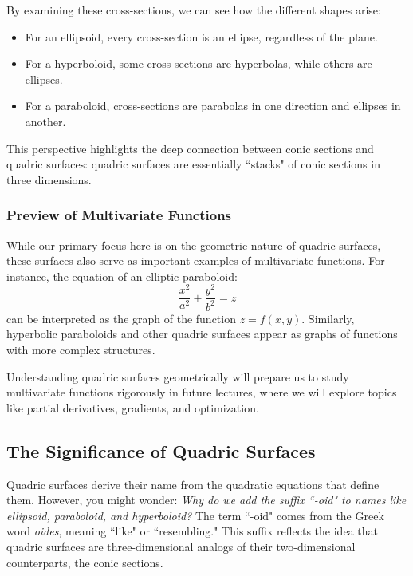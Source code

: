 \noindent By examining these cross-sections, we can see how the different shapes arise:
\begin{itemize}
    \item For an ellipsoid, every cross-section is an ellipse, regardless of the plane.
    \item For a hyperboloid, some cross-sections are hyperbolas, while others are ellipses.
    \item For a paraboloid, cross-sections are parabolas in one direction and ellipses in another.
\end{itemize}

\noindent This perspective highlights the deep connection between conic sections and quadric surfaces: quadric surfaces are essentially ``stacks" of conic sections in three dimensions.

\subsubsection*{Preview of Multivariate Functions}

\noindent While our primary focus here is on the geometric nature of quadric surfaces, these surfaces also serve as important examples of multivariate functions. For instance, the equation of an elliptic paraboloid:
\[
\frac{x^2}{a^2} + \frac{y^2}{b^2} = z
\]
can be interpreted as the graph of the function \( z = f(x, y) \). Similarly, hyperbolic paraboloids and other quadric surfaces appear as graphs of functions with more complex structures.

\noindent Understanding quadric surfaces geometrically will prepare us to study multivariate functions rigorously in future lectures, where we will explore topics like partial derivatives, gradients, and optimization.


\subsection*{The Significance of Quadric Surfaces}

\noindent Quadric surfaces derive their name from the quadratic equations that define them. However, you might wonder: \textit{Why do we add the suffix ``-oid" to names like ellipsoid, paraboloid, and hyperboloid?} The term ``-oid" comes from the Greek word \textit{oides}, meaning ``like" or ``resembling." This suffix reflects the idea that quadric surfaces are three-dimensional analogs of their two-dimensional counterparts, the conic sections. 

